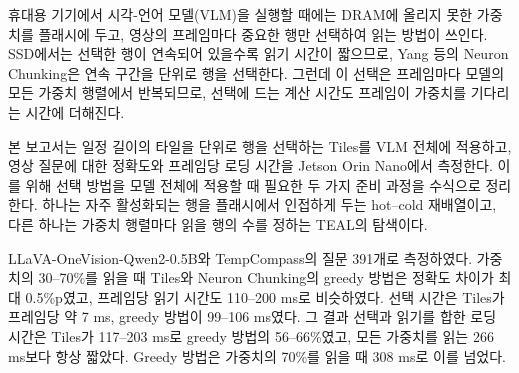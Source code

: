 \KoreanAbstractHeader

휴대용 기기에서 시각-언어 모델(VLM)을 실행할 때에는 DRAM에 올리지 못한 가중치를 플래시에 두고, 영상의 프레임마다 중요한 행만 선택하여 읽는 방법이 쓰인다. SSD에서는 선택한 행이 연속되어 있을수록 읽기 시간이 짧으므로, Yang 등의 Neuron Chunking은 연속 구간을 단위로 행을 선택한다. 그런데 이 선택은 프레임마다 모델의 모든 가중치 행렬에서 반복되므로, 선택에 드는 계산 시간도 프레임이 가중치를 기다리는 시간에 더해진다.

본 보고서는 일정 길이의 타일을 단위로 행을 선택하는 Tiles를 VLM 전체에 적용하고, 영상 질문에 대한 정확도와 프레임당 로딩 시간을 Jetson Orin Nano에서 측정한다. 이를 위해 선택 방법을 모델 전체에 적용할 때 필요한 두 가지 준비 과정을 수식으로 정리한다. 하나는 자주 활성화되는 행을 플래시에서 인접하게 두는 hot--cold 재배열이고, 다른 하나는 가중치 행렬마다 읽을 행의 수를 정하는 TEAL의 탐색이다.

LLaVA-OneVision-Qwen2-0.5B와 TempCompass의 질문 391개로 측정하였다. 가중치의 30--70\%를 읽을 때 Tiles와 Neuron Chunking의 greedy 방법은 정확도 차이가 최대 0.5\%p였고, 프레임당 읽기 시간도 110--200 ms로 비슷하였다. 선택 시간은 Tiles가 프레임당 약 7 ms, greedy 방법이 99--106 ms였다. 그 결과 선택과 읽기를 합한 로딩 시간은 Tiles가 117--203 ms로 greedy 방법의 56--66\%였고, 모든 가중치를 읽는 266 ms보다 항상 짧았다. Greedy 방법은 가중치의 70\%를 읽을 때 308 ms로 이를 넘었다.

